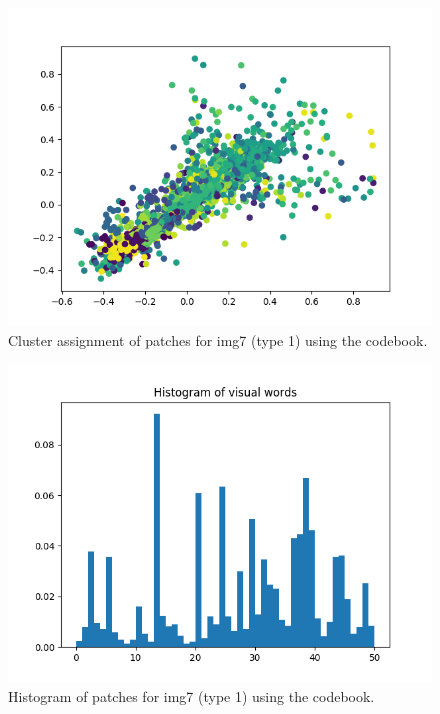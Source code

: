 \documentclass{article}
\begin{document}
\begin{figure}[ht]
  \vskip 0.2in
  \begin{center}
\centerline{\includegraphics[width=\columnwidth]{plot2}}
\caption{Cluster assignment of patches for img7 (type 1) using the codebook.}
  \label{cluster}
  \end{center}
  \vskip -0.2in
\end{figure}

\begin{figure}[ht]
  \vskip 0.2in
  \begin{center}
  \centerline{\includegraphics[width=\columnwidth]{hist2}}
  \caption {Histogram of patches for img7 (type 1) using the codebook.}
  \label{histogram}
  \end{center}
  \vskip -0.2in
\end{figure}
\end{document}
